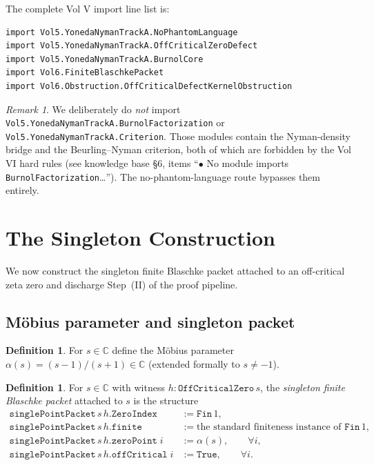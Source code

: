 \documentclass[12pt]{article}
\theoremstyle{definition}
\newtheorem{definition}[theorem]{Definition}
\theoremstyle{remark}
\newtheorem{remark}[theorem]{Remark}
\newcommand{\C}{\mathbb{C}}
\begin{document}
The complete Vol V import line list is:
\begin{verbatim}
import Vol5.YonedaNymanTrackA.NoPhantomLanguage
import Vol5.YonedaNymanTrackA.OffCriticalZeroDefect
import Vol5.YonedaNymanTrackA.BurnolCore
import Vol6.FiniteBlaschkePacket
import Vol6.Obstruction.OffCriticalDefectKernelObstruction
\end{verbatim}

\begin{remark}\label{rem:no-burnol-factorization}
We deliberately do \emph{not} import
\texttt{Vol5.YonedaNymanTrackA.BurnolFactorization} or
\texttt{Vol5.YonedaNymanTrackA.Criterion}. Those modules contain the
Nyman-density bridge and the Beurling--Nyman criterion, both of which are
forbidden by the Vol VI hard rules (see knowledge base \S6, items
``$\bullet$ No module imports \texttt{BurnolFactorization}\dots''). The
no-phantom-language route bypasses them entirely.
\end{remark}

\section{The Singleton Construction}\label{sec:singleton-construction}

We now construct the singleton finite Blaschke packet attached to an
off-critical zeta zero and discharge Step~(II) of the proof pipeline.

\subsection{Möbius parameter and singleton packet}

\begin{definition}\label{def:alpha}
For $s\in\C$ define the Möbius parameter $\alpha(s) = (s-1)/(s+1)\in\C$
(extended formally to $s\neq -1$).
\end{definition}

\begin{definition}\label{def:single-pkt}
For $s\in\C$ with witness $h:\texttt{OffCriticalZero}\,s$, the
\emph{singleton finite Blaschke packet} attached to $s$ is the structure
\begin{align*}
\texttt{singlePointPacket}\,s\,h.\texttt{ZeroIndex}
   &:= \texttt{Fin}\,1, \\
\texttt{singlePointPacket}\,s\,h.\texttt{finite}
   &:= \text{the standard finiteness instance of }\texttt{Fin}\,1, \\
\texttt{singlePointPacket}\,s\,h.\texttt{zeroPoint}\;i
   &:= \alpha(s),\qquad \forall i, \\
\texttt{singlePointPacket}\,s\,h.\texttt{offCritical}\;i
   &:= \texttt{True},\qquad \forall i.
\end{align*}
\end{definition}
\end{document}
